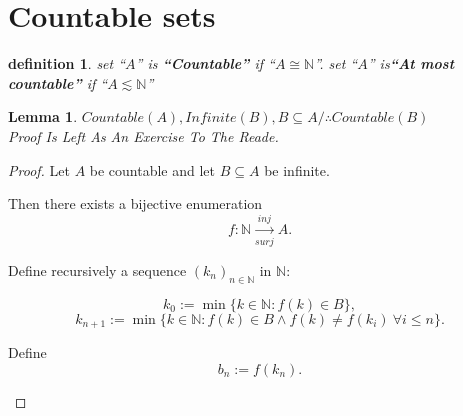 \documentclass[10pt,a4paper]{book}
\newtheorem{definition}{definition}[section]
\newtheorem{lemma}{Lemma}[section]
\begin{document}
\section{Countable sets}

\begin{definition}
    set ``$A$'' is \textbf{``Countable''} if  ``$ A \cong \mathbb{N}$''. set ``$A$'' is\textbf{``At most countable''}  if  ``$ A \lesssim \mathbb{N}$''
\end{definition}

\begin{lemma} $ Countable(A) ,Infinite(B) , B \subseteq A / \therefore  Countable(B)   $\\
    Proof Is Left As An Exercise To The Reade.
\end{lemma}

\begin{proof}

    Let $A$ be countable and let $B\subseteq A$ be infinite.

    Then there exists a bijective enumeration
    \[
        f:\mathbb N \xrightarrow[surj]{inj} A.
    \]

    Define recursively a sequence $(k_n)_{n\in\mathbb N}$ in $\mathbb N$:

    \[
        k_0 := \min\{k\in\mathbb N : f(k)\in B\},
    \]
    \[
        k_{n+1} := \min\{k\in\mathbb N : f(k)\in B \land f(k)\neq f(k_i)\ \forall i\le n\}.
    \]

    Define
    \[
        b_n := f(k_n).
    \]

    \begin{fitchproof}[arrayenv=tabular]


        \open
        \close








    \end{fitchproof}

\end{proof}
\end{document}
